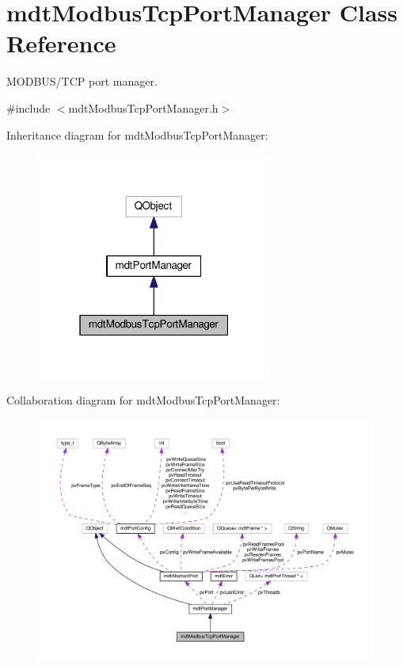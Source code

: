 \hypertarget{classmdt_modbus_tcp_port_manager}{\section{mdt\-Modbus\-Tcp\-Port\-Manager Class Reference}
\label{classmdt_modbus_tcp_port_manager}
}


M\-O\-D\-B\-U\-S/\-T\-C\-P port manager.  




{\ttfamily \#include $<$mdt\-Modbus\-Tcp\-Port\-Manager.\-h$>$}



Inheritance diagram for mdt\-Modbus\-Tcp\-Port\-Manager\-:
\nopagebreak
\begin{figure}[H]
\begin{center}
\leavevmode
\includegraphics[width=220pt]{classmdt_modbus_tcp_port_manager__inherit__graph}
\end{center}
\end{figure}


Collaboration diagram for mdt\-Modbus\-Tcp\-Port\-Manager\-:
\nopagebreak
\begin{figure}[H]
\begin{center}
\leavevmode
\includegraphics[width=350pt]{classmdt_modbus_tcp_port_manager__coll__graph}
\end{center}
\end{figure}

